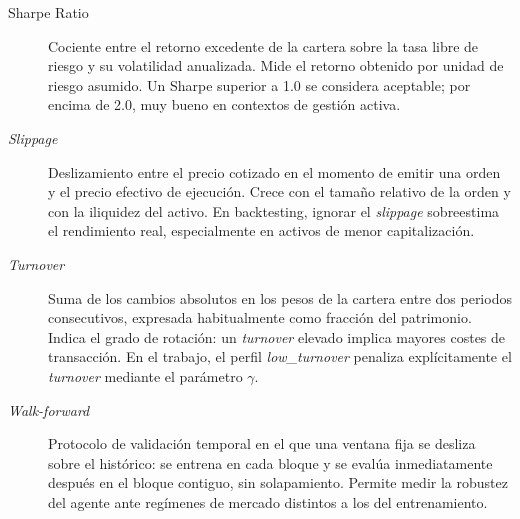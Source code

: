 \documentclass[IB,a4paper]{TFUOC}
\begin{document}
\begin{description}
    \item[Sharpe Ratio] Cociente entre el retorno excedente de la cartera sobre la tasa libre de riesgo y su volatilidad anualizada. Mide el retorno obtenido por unidad de riesgo asumido. Un Sharpe superior a 1.0 se considera aceptable; por encima de 2.0, muy bueno en contextos de gestión activa.

    \item[\textit{Slippage}] Deslizamiento entre el precio cotizado en el momento de emitir una orden y el precio efectivo de ejecución. Crece con el tamaño relativo de la orden y con la iliquidez del activo. En backtesting, ignorar el \textit{slippage} sobreestima el rendimiento real, especialmente en activos de menor capitalización.

    \item[\textit{Turnover}] Suma de los cambios absolutos en los pesos de la cartera entre dos periodos consecutivos, expresada habitualmente como fracción del patrimonio. Indica el grado de rotación: un \textit{turnover} elevado implica mayores costes de transacción. En el trabajo, el perfil \textit{low\_turnover} penaliza explícitamente el \textit{turnover} mediante el parámetro $\gamma$.

    \item[\textit{Walk-forward}] Protocolo de validación temporal en el que una ventana fija se desliza sobre el histórico: se entrena en cada bloque y se evalúa inmediatamente después en el bloque contiguo, sin solapamiento. Permite medir la robustez del agente ante regímenes de mercado distintos a los del entrenamiento.

\end{description}



\clearpage
{}
\renewcommand{\bibname}{Bibliografia}



\end{document}
